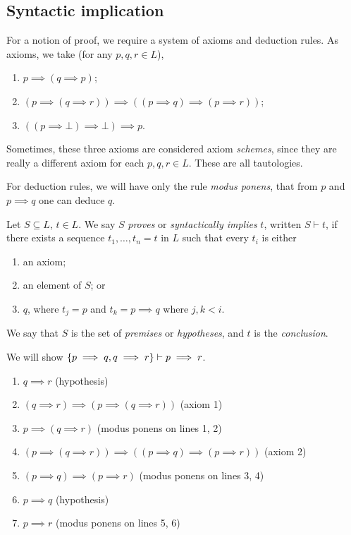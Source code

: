 \subsection{Syntactic implication}
For a notion of proof, we require a system of axioms and deduction rules.
As axioms, we take (for any \( p, q, r \in L \)),
\begin{enumerate}
    \item \( p \implies (q \implies p) \);
    \item \( (p \implies (q \implies r)) \implies ((p \implies q) \implies (p \implies r)) \);
    \item \( ((p \implies \bot) \implies \bot) \implies p \).
\end{enumerate}
\begin{remark}
    Sometimes, these three axioms are considered axiom \emph{schemes}, since they are really a different axiom for each \( p, q, r \in L \).
    These are all tautologies.
\end{remark}
For deduction rules, we will have only the rule \emph{modus ponens}, that from \( p \) and \( p \implies q \) one can deduce \( q \).
\begin{definition}
    Let \( S \subseteq L \), \( t \in L \).
    We say \( S \) \emph{proves} or \emph{syntactically implies} \( t \), written \( S \vdash t \), if there exists a sequence \( t_1, \dots, t_n = t \) in \( L \) such that every \( t_i \) is either
    \begin{enumerate}
        \item an axiom;
        \item an element of \( S \); or
        \item \( q \), where \( t_j = p \) and \( t_k = p \implies q \) where \( j, k < i \).
    \end{enumerate}
    We say that \( S \) is the set of \emph{premises} or \emph{hypotheses}, and \( t \) is the \emph{conclusion}.
\end{definition}
\begin{example}
    We will show \( \qty{p \implies q, q \implies r} \vdash p \implies r \).
    \begin{enumerate}[1.]
        \item \( q \implies r \) (hypothesis)
        \item \( (q \implies r) \implies (p \implies (q \implies r)) \) (axiom 1)
        \item \( p \implies (q \implies r) \) (modus ponens on lines 1, 2)
        \item \( (p \implies (q \implies r)) \implies ((p \implies q) \implies (p \implies r)) \) (axiom 2)
        \item \( (p \implies q) \implies (p \implies r) \) (modus ponens on lines 3, 4)
        \item \( p \implies q \) (hypothesis)
        \item \( p \implies r \) (modus ponens on lines 5, 6)
    \end{enumerate}
\end{example}
